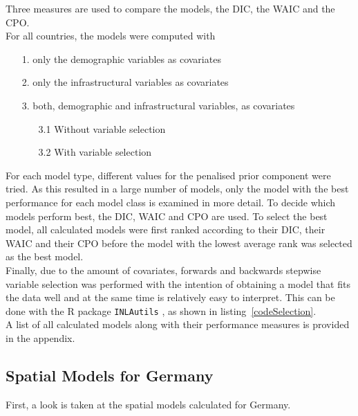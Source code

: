 Three measures are used to compare the models, the DIC, the WAIC and the CPO. \\
For all countries, the models were computed with
\begin{itemize}
    \item[1.] only the demographic variables as covariates
    \item[2.] only the infrastructural variables as covariates
    \item[3.] both, demographic and infrastructural variables, as covariates
    \begin{itemize}
        \item[3.1] Without variable selection
        \item[3.2] With variable selection
    \end{itemize}
\end{itemize}
For each model type, different values for the penalised prior component were tried. As this resulted in a large number of models, only the model with the best performance for each model class is examined in more detail. To decide which models perform best, the DIC, WAIC and CPO are used. To select the best model, all calculated models were first ranked according to their DIC, their WAIC and their CPO before the model with the lowest average rank was selected as the best model. \\
Finally, due to the amount of covariates, forwards and backwards stepwise variable selection was performed with the intention of obtaining a model that fits the data well and at the same time is relatively easy to interpret. This can be done with the R package \texttt{INLAutils} \cite{inlautils}, as shown in listing~\ref{codeSelection}. \\
A list of all calculated models along with their performance measures is provided in the appendix.
\subsection{Spatial Models for Germany}
First, a look is taken at the spatial models calculated for Germany. 
